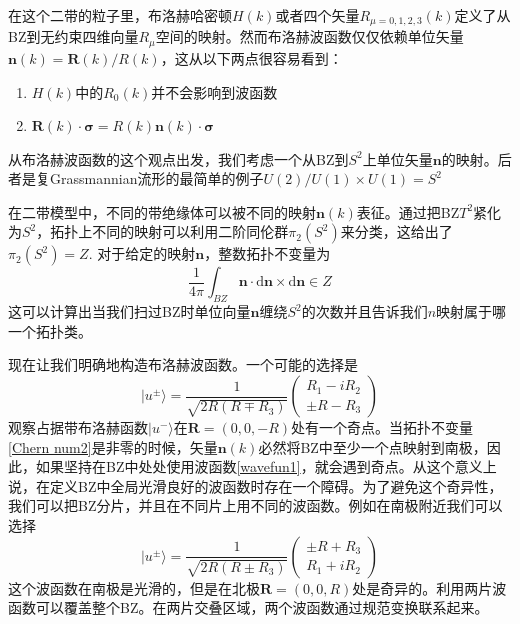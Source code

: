 \documentclass{article}
\numberwithin{equation}{subsection}
\begin{document}
在这个二带的粒子里，布洛赫哈密顿$H(k)$或者四个矢量$R_{\mu=0,1,2,3}(k)$定义了从BZ到无约束四维向量$R_\mu$空间的映射。然而布洛赫波函数仅仅依赖单位矢量$\mathbf{n}(k)=\mathbf{R}(k)/R(k)$，这从以下两点很容易看到：
\begin{enumerate}
    \item $H(k)$中的$R_0(k)$并不会影响到波函数
    \item $\mathbf{R}(k)\cdot\mathbf{\sigma}=R(k)\mathbf{n}(k)\cdot\mathbf{\sigma}$
\end{enumerate}
从布洛赫波函数的这个观点出发，我们考虑一个从BZ到$S^2$上单位矢量$\mathbf{n}$的映射。后者是复Grassmannian流形的最简单的例子$U(2)/U(1)\times U(1)=S^2$

在二带模型中，不同的带绝缘体可以被不同的映射$\mathbf{n}(k)$表征。通过把BZ$T^2$紧化为$S^2$，拓扑上不同的映射可以利用二阶同伦群$\pi_2(S^2)$来分类，这给出了$\pi_2(S^2)=Z$. 对于给定的映射$\mathbf{n}$，整数拓扑不变量为
\begin{equation}\label{Chern num2}
    \frac{1}{4\pi}\int_{BZ}\mathbf{n}\cdot\mathrm{d}\mathbf{n}\times\mathrm{d}\mathbf{n}\in Z
\end{equation}
这可以计算出当我们扫过BZ时单位向量$\mathbf{n}$缠绕$S^2$的次数并且告诉我们$n$映射属于哪一个拓扑类。

现在让我们明确地构造布洛赫波函数。一个可能的选择是
\begin{equation}\label{wavefun1}
    |u^{\pm}\rangle=\frac{1}{\sqrt{2R(R\mp R_3)}}\begin{pmatrix}
        R_1-iR_2\\
        \pm R-R_3
    \end{pmatrix}
\end{equation}
观察占据带布洛赫函数$|u^-\rangle$在$\mathbf{R}=(0,0,-R)$处有一个奇点。当拓扑不变量\eqref{Chern num2}是非零的时候，矢量$\mathbf{n}(k)$必然将BZ中至少一个点映射到南极，因此，如果坚持在BZ中处处使用波函数\eqref{wavefun1}，就会遇到奇点。从这个意义上说，在定义BZ中全局光滑良好的波函数时存在一个障碍。为了避免这个奇异性，我们可以把BZ分片，并且在不同片上用不同的波函数。例如在南极附近我们可以选择
\begin{equation}\label{wavefun2}
    |u^\pm\rangle=\frac{1}{\sqrt{2R(R\pm R_3)}}\begin{pmatrix}
        \pm R+R_3\\
        R_1+i R_2
    \end{pmatrix}
\end{equation}
这个波函数在南极是光滑的，但是在北极$\mathbf{R}=(0,0,R)$处是奇异的。利用两片波函数可以覆盖整个BZ。在两片交叠区域，两个波函数通过规范变换联系起来。
\end{document}
